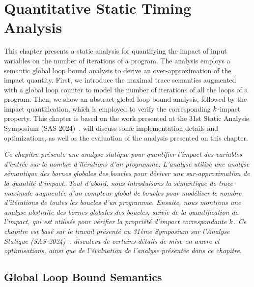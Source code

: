 
\setchapterpreamble[u]{\margintoc}

\chapter{Quantitative Static Timing Analysis}


\marginemptybox{6.5cm}

This chapter presents a static analysis for quantifying the impact of input variables on the number of iterations of a program.
The analysis employs a semantic global loop bound analysis to derive an over-approximation of the impact quantity.
First, we introduce the maximal trace semantics augmented with a global loop counter to model the number of iterations of all the loops of a program.
Then, we show an abstract global loop bound analysis, followed by the impact quantification, which is employed to verify the corresponding $k$-impact property.
This chapter is based on the work presented at the 31st Static Analysis Symposium (SAS 2024)~.
 will discuss some implementation details and optimizations, as well as the evaluation of the analysis presented on this chapter.


\frenchdiv

\emph{Ce chapitre présente une analyse statique pour quantifier l'impact des variables d'entrée sur le nombre d'itérations d'un programme. L'analyse utilise une analyse sémantique des bornes globales des boucles pour dériver une sur-approximation de la quantité d'impact. Tout d'abord, nous introduisons la sémantique de trace maximale augmentée d'un compteur global de boucles pour modéliser le nombre d'itérations de toutes les boucles d'un programme. Ensuite, nous montrons une analyse abstraite des bornes globales des boucles, suivie de la quantification de l'impact, qui est utilisée pour vérifier la propriété d'impact correspondante $k$. Ce chapitre est basé sur le travail présenté au 31ème Symposium sur l'Analyse Statique (SAS 2024)~\cite{Mazzucato2024c}.  discutera de certains détails de mise en œuvre et optimisations, ainsi que de l'évaluation de l'analyse présentée dans ce chapitre.}



\section{Global Loop Bound Semantics}



